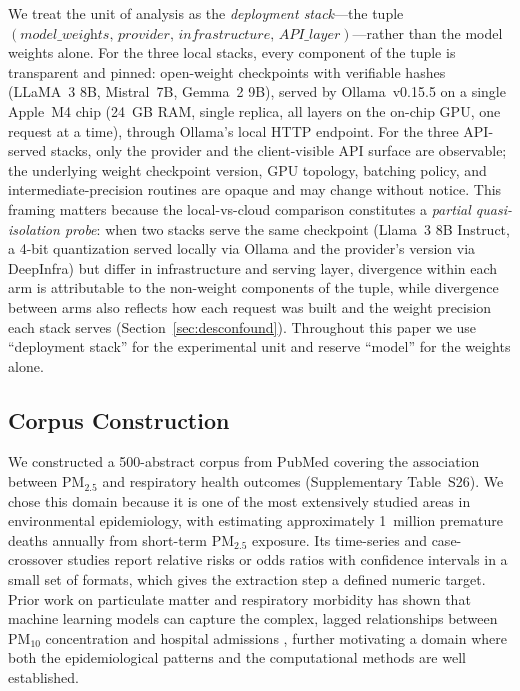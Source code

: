 \documentclass[preprint,review,12pt,authoryear]{elsarticle}
\begin{document}
We treat the unit of analysis as the \emph{deployment stack}---the tuple $(\textit{model\_weights},\,\textit{provider},\,\textit{infrastructure},\,\textit{API\_layer})$---rather than the model weights alone.
For the three local stacks, every component of the tuple is transparent and pinned: open-weight checkpoints with verifiable hashes (LLaMA~3 8B, Mistral~7B, Gemma~2 9B), served by Ollama~v0.15.5 on a single Apple~M4 chip (24~GB RAM, single replica, all layers on the on-chip GPU, one request at a time), through Ollama's local HTTP endpoint.
For the three API-served stacks, only the provider and the client-visible API surface are observable; the underlying weight checkpoint version, GPU topology, batching policy, and intermediate-precision routines are opaque and may change without notice.
This framing matters because the local-vs-cloud comparison constitutes a \emph{partial quasi-isolation probe}: when two stacks serve the same checkpoint (Llama~3 8B Instruct, a 4-bit quantization served locally via Ollama and the provider's version via DeepInfra) but differ in infrastructure and serving layer, divergence within each arm is attributable to the non-weight components of the tuple, while divergence between arms also reflects how each request was built and the weight precision each stack serves (Section~\ref{sec:desconfound}).
Throughout this paper we use ``deployment stack'' for the experimental unit and reserve ``model'' for the weights alone.

\subsection{Corpus Construction}
\label{sec:corpus}

We constructed a 500-abstract corpus from PubMed covering the association between PM$_{2.5}$ and respiratory health outcomes (Supplementary Table~S26).
We chose this domain because it is one of the most extensively studied areas in environmental epidemiology, with \citet{yu2024lancet} estimating approximately 1~million premature deaths annually from short-term PM$_{2.5}$ exposure.
Its time-series and case-crossover studies report relative risks or odds ratios with confidence intervals in a small set of formats, which gives the extraction step a defined numeric target.
Prior work on particulate matter and respiratory morbidity has shown that machine learning models can capture the complex, lagged relationships between PM$_{10}$ concentration and hospital admissions \citep{tadano2021unorganized}, further motivating a domain where both the epidemiological patterns and the computational methods are well established.
\end{document}
